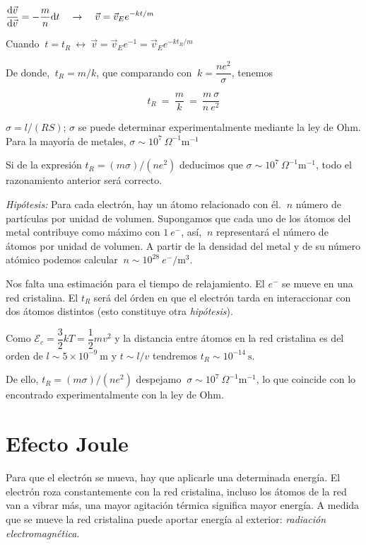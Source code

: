 $\displaystyle \dv{\vec v}{\vec v}=-\dfrac m n \dd t \quad \to \quad \vec v=\vec v_E e^{-kt/m}$

Cuando $\ t=t_R \ \leftrightarrow \ \vec v=\vec v_E e^{-1}=\vec v_E e^{-kt_R/m}$

De donde, $\ t_R=m/k$, que comparando con $\ k=\dfrac{ne^2}{\sigma}$, tenemos

$$t_R \ = \ \dfrac m k \ = \ \dfrac {m\ \sigma}{n\ e^2}$$

$\sigma= l/(RS)$; $\sigma$ se puede determinar experimentalmente mediante la ley de Ohm. Para la mayoría de metales, $\sigma \sim 10^7 \ \Omega^{-1} \mathrm{m}^{-1}$

Si de la expresión $t_R  =  (m\sigma)/(n e^2)$ deducimos que $\sigma \sim 10^7 \ \Omega^{-1} \mathrm{m}^{-1}$, todo el razonamiento anterior será correcto.

\emph{Hipótesis:} Para cada electrón, hay un átomo relacionado con él.  $\ n$ número de partículas por unidad de volumen. Supongamos que cada uno de los átomos del metal contribuye como máximo con $1 \ e^{-}$, así, $\ n$ representará el número de átomos por unidad de volumen. A partir de la densidad del metal y de su número atómico podemos calcular $\ n \sim 10^{28} \ e^-/\mathrm{m}^3$.

Nos falta una estimación para el tiempo de relajamiento. El $e^-$ se mueve en una red cristalina. El $t_R$ será del órden en que el electrón tarda en interaccionar con dos átomos distintos (esto constituye otra \emph{hipótesis}).

Como $\mathcal E_c=\dfrac 3 2 k T = \dfrac 1 2 m v^2$ y la distancia entre átomos en la red cristalina es del orden de $l \sim 5\times 10^{-9}\ \mathrm{m}$ y $t\sim l/v$ tendremos $t_R \sim 10^{-14} \ \mathrm{s}$.

De ello, $t_R  =  (m\sigma)/(n e^2)$ despejamo $\ \sigma \sim 10^7 \ \Omega^{-1} \mathrm{m}^{-1}$, lo que coincide con lo encontrado experimentalmente con la ley de Ohm.

\section{Efecto Joule}

Para que el electrón se mueva, hay que aplicarle una determinada energía.  El electrón roza constantemente con la red cristalina, incluso los átomos de la red van a vibrar más, una mayor agitación térmica significa mayor energía. A medida que se mueve la red cristalina puede aportar energía al exterior: \emph{radiación electromagnética}.

